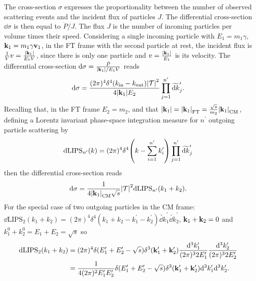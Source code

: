 The cross-section $\sigma$  expresses the proportionality between the number of observed scattering events and the incident flux of particles $J$. The differential cross-section $\dd \sigma$ is then equal to $\dot{P}/J$. The flux $J$ is the number of incoming particles per volume times their speed. Considering a single incoming particle with $E_1=m_1\gamma$, $\vb{k}_1=m_1\gamma\vb{v}_1$, in the FT frame with the second particle at rest, the incident flux is $\frac{1}{V}v=\frac{\abs{\vb{k}_1}}{E_1V}$, since there is only one particle and $v=\frac{\abs{\vb{k}_1}}{E_1}$ is its velocity. The differential cross-section $\dd\sigma=\frac{\dot{P}}{\abs{\vb{k}_1}/E_1V}$ reads
\begin{equation}
    \dd \sigma=\frac{(2\pi)^4\delta^4(k_{\text{in}}-k_{\text{out}})\abs{\mathcal{T}}^2}{4\abs{\vb{k}_1}E_2}\prod_{j=1}^{n^\prime}\widetilde{\dd k}^\prime_j.
\end{equation}
Recalling that, in the FT frame $E_2=m_2$, and that $\abs{\vb{k}_1}=\abs{\vb{k}_1}_{\text{FT}}=\frac{\sqrt{s}}{m_2}\abs{\vb{k}_1}_{\text{CM}}$, defining a Lorentz invariant phase-space integration measure for $n^\prime$ outgoing particle scattering by
\begin{equation}
    \dd \text{LIPS}_{n^\prime}(k)=(2\pi)^4\delta^4\qty(k-\sum_{i=1}^{n^\prime}k_i^\prime)\prod_{j=1}^{n^\prime}\widetilde{\dd k}_j^\prime
\end{equation}
then the differential cross-section reads
\begin{equation}
    \dd \sigma=\frac{1}{4\abs{\vb{k}_1}_{\text{CM}}\sqrt{s}}\abs{\mathcal{T}}^2\dd \text{LIPS}_{n^\prime}(k_1+k_2).
\end{equation}
For the special case of two outgoing particles in the CM frame: $\dd \text{LIPS}_{2}(k_1+k_2)=(2\pi)^4\delta^4(k_1+k_2-k_1^\prime-k_2^\prime)\widetilde{\dd k}_1^\prime\widetilde{\dd k}_2^\prime$, $\vb{k}_1+\vb{k}_2=0$ and $k^0_1+k^0_2=E_1+E_2=\sqrt{s}$ so 
\begin{equation}
    \begin{aligned}
        \dd \text{LIPS}_{2}(k_1+k_2)&=(2\pi)^4\delta(E_1^\prime+E_2^\prime-\sqrt{s})\delta^3(\vb{k}_1^\prime+\vb{k}_2^\prime)\frac{\dd^3k_1^\prime}{(2\pi)^32E_1^\prime}\frac{\dd^3k_2^\prime}{(2\pi)^32E_2^\prime}\\
        &=\frac{1}{4(2\pi)^2E_1^\prime E_2^\prime}\delta(E_1^\prime+E_2^\prime-\sqrt{s})\delta^3(\vb{k}_1^\prime+\vb{k}_2^\prime)\dd^3k_1^\prime\dd^3k_2^\prime.
    \end{aligned}
\end{equation}

